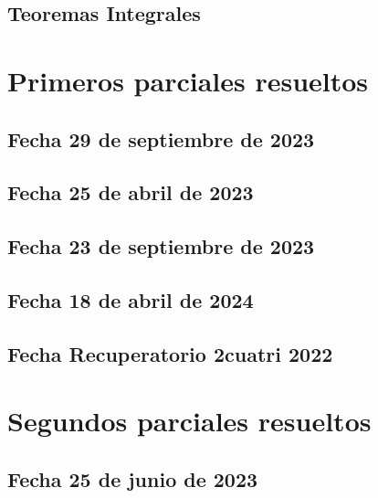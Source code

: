 \documentclass[10pt, a4paper]{report}
\begin{document}
        \section{Teoremas Integrales}
            

    \chapter{Primeros parciales resueltos}
        \section{Fecha 29 de septiembre de 2023}
            

        \newpage
        \section{Fecha 25 de abril de 2023}
            

            \newpage
        \section{Fecha 23 de septiembre de 2023}
            

            \newpage
        \section{Fecha 18 de abril de 2024}
            
            

        \newpage
        \section{Fecha Recuperatorio 2cuatri 2022}
            


        \newpage
    \chapter{Segundos parciales resueltos}
        \section{Fecha 25 de junio de 2023}
            
\end{document}
